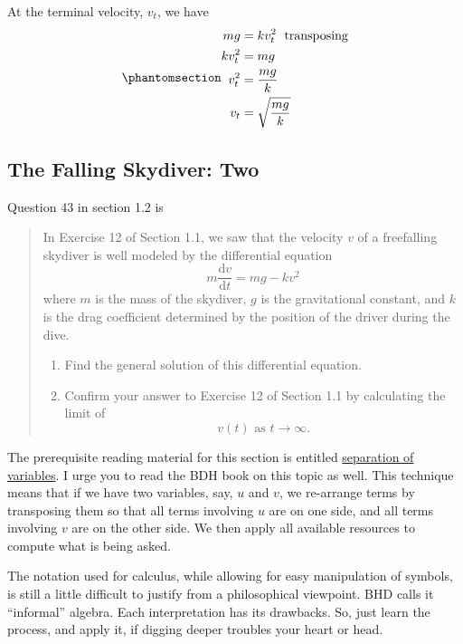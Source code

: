 \documentclass[
  a4paper,
]{article}
\begin{document}
At the terminal velocity, \(v_t\), we have
\begin{equation}\phantomsection\label{eq:value-vt}{
\begin{aligned}
mg &= kv_t^2\; \text{ transposing}\\
kv_{t}^2 &= mg\\
v_t^{2} &= \frac{mg}{k}\\
v_t &= \sqrt{\frac{mg}{k}}
\end{aligned}
}\end{equation}

\subsection{The Falling Skydiver: Two}\label{the-falling-skydiver-two}

Question 43 in section 1.2 is

\begin{quote}
In Exercise 12 of Section 1.1, we saw that the velocity \(v\) of a
freefalling skydiver is well modeled by the differential equation \[
m\frac{\mathrm{d}v}{\mathrm{d}t} = mg - kv^2
\] where \(m\) is the mass of the skydiver, \(g\) is the gravitational
constant, and \(k\) is the drag coefficient determined by the position
of the driver during the dive.

\begin{enumerate}
\def\labelenumi{(\alph{enumi})}
\item
  Find the general solution of this differential equation.
\item
  Confirm your answer to Exercise 12 of Section 1.1 by calculating the
  limit of \[
  v(t) \text{ as } t\to\infty.
  \]
\end{enumerate}
\end{quote}

The prerequisite reading material for this section is entitled
\href{https://en.wikipedia.org/wiki/Separation_of_variables}{separation
of variables}. I urge you to read the BDH book on this topic as well.
This technique means that if we have two variables, say, \(u\) and
\(v\), we re-arrange terms by transposing them so that all terms
involving \(u\) are on one side, and all terms involving \(v\) are on
the other side. We then apply all available resources to compute what is
being asked.

The notation used for calculus, while allowing for easy manipulation of
symbols, is still a little difficult to justify from a philosophical
viewpoint. BHD calls it ``informal'' algebra. Each interpretation has
its drawbacks. So, just learn the process, and apply it, if digging
deeper troubles your heart or head.
\end{document}

